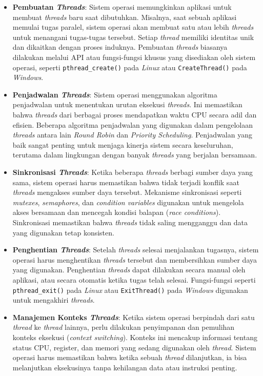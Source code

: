 \documentclass[12pt]{article}
\begin{document}
\begin{itemize}
    \item \textbf{Pembuatan \textit{Threads}}: Sistem operasi memungkinkan aplikasi untuk membuat \textit{threads} baru saat dibutuhkan. Misalnya, saat sebuah aplikasi memulai tugas paralel, sistem operasi akan membuat satu atau lebih \textit{threads} untuk menangani tugas-tugas tersebut. Setiap \textit{thread} memiliki identitas unik dan dikaitkan dengan proses induknya. Pembuatan \textit{threads} biasanya dilakukan melalui API atau fungsi-fungsi khusus yang disediakan oleh sistem operasi, seperti \texttt{pthread\_create()} pada \textit{Linux} atau \texttt{CreateThread()} pada \textit{Windows}.

    \item \textbf{Penjadwalan \textit{Threads}}: Sistem operasi menggunakan algoritma penjadwalan untuk menentukan urutan eksekusi \textit{threads}. Ini memastikan bahwa \textit{threads} dari berbagai proses mendapatkan waktu CPU secara adil dan efisien. Beberapa algoritma penjadwalan yang digunakan dalam pengelolaan \textit{threads} antara lain \textit{Round Robin} dan \textit{Priority Scheduling}. Penjadwalan yang baik sangat penting untuk menjaga kinerja sistem secara keseluruhan, terutama dalam lingkungan dengan banyak \textit{threads} yang berjalan bersamaan.

    \item \textbf{Sinkronisasi \textit{Threads}}: Ketika beberapa \textit{threads} berbagi sumber daya yang sama, sistem operasi harus memastikan bahwa tidak terjadi konflik saat \textit{threads} mengakses sumber daya tersebut. Mekanisme sinkronisasi seperti \textit{mutexes}, \textit{semaphores}, dan \textit{condition variables} digunakan untuk mengelola akses bersamaan dan mencegah kondisi balapan (\textit{race conditions}). Sinkronisasi memastikan bahwa \textit{threads} tidak saling mengganggu dan data yang digunakan tetap konsisten.

    \item \textbf{Penghentian \textit{Threads}}: Setelah \textit{threads} selesai menjalankan tugasnya, sistem operasi harus menghentikan \textit{threads} tersebut dan membersihkan sumber daya yang digunakan. Penghentian \textit{threads} dapat dilakukan secara manual oleh aplikasi, atau secara otomatis ketika tugas telah selesai. Fungsi-fungsi seperti \texttt{pthread\_exit()} pada \textit{Linux} atau \texttt{ExitThread()} pada \textit{Windows} digunakan untuk mengakhiri \textit{threads}.

    \item \textbf{Manajemen Konteks \textit{Threads}}: Ketika sistem operasi berpindah dari satu \textit{thread} ke \textit{thread} lainnya, perlu dilakukan penyimpanan dan pemulihan konteks eksekusi (\textit{context switching}). Konteks ini mencakup informasi tentang status CPU, register, dan memori yang sedang digunakan oleh \textit{thread}. Sistem operasi harus memastikan bahwa ketika sebuah \textit{thread} dilanjutkan, ia bisa melanjutkan eksekusinya tanpa kehilangan data atau instruksi penting.
\end{itemize}
\end{document}
